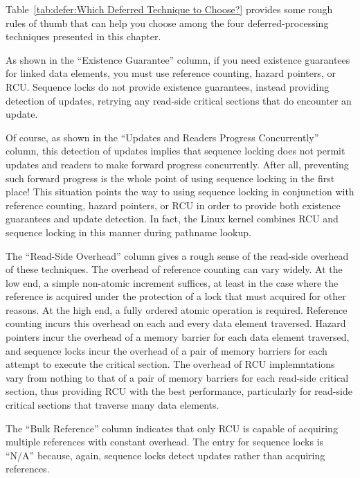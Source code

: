 Table~\ref{tab:defer:Which Deferred Technique to Choose?}
provides some rough rules of thumb that can help you choose among the
four deferred-processing techniques presented in this chapter.

As shown in the ``Existence Guarantee'' column,
if you need existence guarantees for linked
data elements, you must use reference counting, hazard pointers, or RCU.
Sequence locks do not provide existence guarantees, instead providing
detection of updates, retrying any read-side critical sections
that do encounter an update.

Of course, as shown in the ``Updates and Readers Progress Concurrently''
column, this detection of updates implies
that sequence locking does not permit updates and readers to make forward
progress concurrently.
After all, preventing such forward progress is the whole point of using
sequence locking in the first place!
This situation points the way to using sequence locking in conjunction
with reference counting, hazard pointers, or RCU in order to provide
both existence guarantees and update detection.
In fact, the Linux kernel combines RCU and sequence locking in
this manner during pathname lookup.

The ``Read-Side Overhead'' column gives a rough sense of the read-side
overhead of these techniques.
The overhead of reference counting can vary widely.
At the low end, a simple non-atomic increment suffices, at least in the
case where the reference is acquired under the protection of a lock
that must acquired for other reasons.
At the high end, a fully ordered atomic operation is required.
Reference counting incurs this overhead on each and every data element
traversed.
Hazard pointers incur the overhead of a memory barrier for each data element
traversed, and sequence locks incur the overhead of a pair of memory barriers
for each attempt to execute the critical section.
The overhead of RCU implemntations vary from nothing to that of a pair of
memory barriers for each read-side critical section, thus providing RCU
with the best performance, particularly for read-side critical sections
that traverse many data elements.

The ``Bulk Reference'' column indicates that only RCU is capable of acquiring
multiple references with constant overhead.
The entry for sequence locks is ``N/A'' because, again, sequence locks
detect updates rather than acquiring references.

